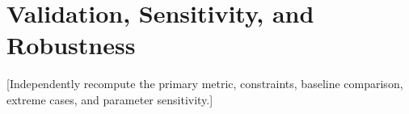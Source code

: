\section{Validation, Sensitivity, and Robustness}
[Independently recompute the primary metric, constraints, baseline comparison, extreme cases, and parameter sensitivity.]

